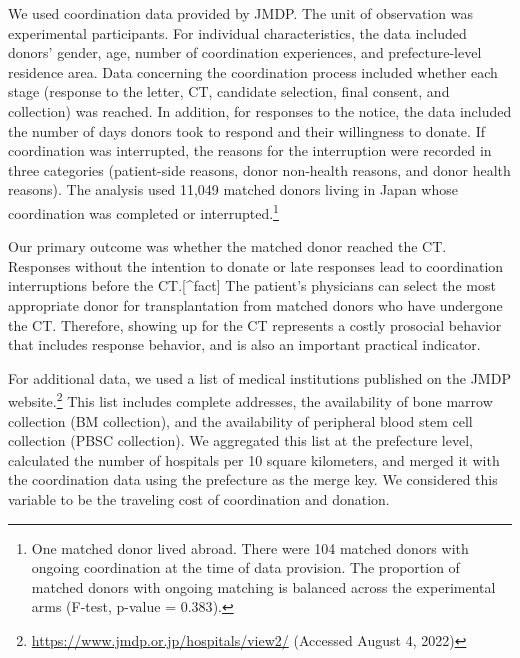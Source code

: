 \documentclass[12pt, a4paper]{article}
\begin{document}
We used coordination data provided by JMDP. The unit of observation was experimental participants. For individual characteristics, the data included donors' gender, age, number of coordination experiences, and prefecture-level residence area. Data concerning the coordination process included whether each stage (response to the letter, CT, candidate selection, final consent, and collection) was reached. In addition, for responses to the notice, the data included the number of days donors took to respond and their willingness to donate. If coordination was interrupted, the reasons for the interruption were recorded in three categories (patient-side reasons, donor non-health reasons, and donor health reasons). The analysis used 11,049 matched donors living in Japan whose coordination was completed or interrupted.\footnote{One matched donor lived abroad. There were 104 matched donors with ongoing coordination at the time of data provision. The proportion of matched donors with ongoing matching is balanced across the experimental arms (F-test, p-value = \(0.383\)).}

Our primary outcome was whether the matched donor reached the CT. Responses without the intention to donate or late responses lead to coordination interruptions before the CT.{[}\^{}fact{]} The patient's physicians can select the most appropriate donor for transplantation from matched donors who have undergone the CT. Therefore, showing up for the CT represents a costly prosocial behavior that includes response behavior, and is also an important practical indicator.

For additional data, we used a list of medical institutions published on the JMDP website.\footnote{\url{https://www.jmdp.or.jp/hospitals/view2/} (Accessed August 4, 2022)} This list includes complete addresses, the availability of bone marrow collection (BM collection), and the availability of peripheral blood stem cell collection (PBSC collection). We aggregated this list at the prefecture level, calculated the number of hospitals per 10 square kilometers, and merged it with the coordination data using the prefecture as the merge key. We considered this variable to be the traveling cost of coordination and donation.
\end{document}
